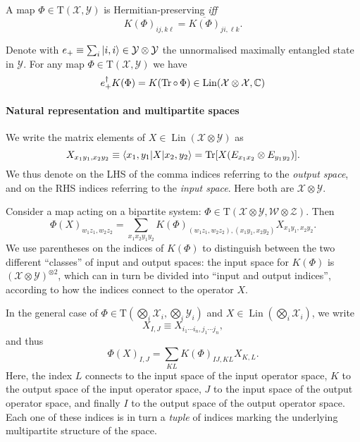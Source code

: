 \documentclass[12pt]{report}
\newcommand{\CC}{\mathbb{C}}
\newcommand{\calY}{{\mathcal{Y}}}
\newcommand{\calW}{{\mathcal{W}}}
\newcommand{\calX}{{\mathcal{X}}}
\newcommand{\calZ}{{\mathcal{Z}}}
\newcommand{\rmT}{{\mathrm{T}}}
\DeclareMathOperator{\Lin}{Lin}
\begin{document}
\begin{prop}
	A map $\Phi\in\rmT(\calX,\calY)$ is Hermitian-preserving \emph{iff}
	\begin{equation}
		K(\Phi)_{ij,k\ell} = \overline{K(\Phi)}_{ji,\ell k}.
	\end{equation}
\end{prop}

\begin{prop}
	Denote with $e_+\equiv \sum_i \ket{i,i}\in\calY\otimes\calY$ the unnormalised maximally entangled state in $\calY$.
	For any map $\Phi\in\rmT(\calX,\calY)$ we have
	\begin{equation}
		e_+^\dagger K(\Phi) = K(\Tr\circ\, \Phi) \in \Lin(\calX\otimes\calX,\CC)
	\end{equation}
\end{prop}

\paragraph{Natural representation and multipartite spaces}
We write the matrix elements of $X\in\Lin(\calX\otimes\calY)$ as
\begin{equation}
	X_{x_1 y_1,x_2 y_2}
	\equiv \langle x_1, y_1 | X | x_2, y_2\rangle
	= \Tr[X (E_{x_1 x_2} \otimes E_{y_1 y_2})].
\end{equation}
We thus denote on the LHS of the comma indices referring to the \emph{output space}, and on the RHS indices referring to the \emph{input space}. Here both are $\calX\otimes\calY$.

Consider a map acting on a bipartite system: $\Phi\in\rmT(\calX\otimes\calY,\calW\otimes\calZ)$. Then
\begin{equation}
	\Phi(X)_{w_1 z_1, w_2 z_2}
	= \sum_{x_1 x_2 y_1 y_2}
	K(\Phi)_{(w_1 z_1, w_2 z_2),(x_1 y_1, x_2 y_2)}
	X_{x_1 y_1,x_2 y_2}.
\end{equation}
We use parentheses on the indices of $K(\Phi)$ to distinguish between the two different ``classes'' of input and output spaces: the input space for $K(\Phi)$ is $(\calX\otimes\calY)^{\otimes 2}$, which can in turn be divided into ``input and output indices'', according to how the indices connect to the operator $X$.

In the general case of $\Phi\in\rmT(\bigotimes_i \calX_i,\bigotimes_i \calY_i)$ and $X\in\Lin(\bigotimes_i \calX_i)$, we write
\begin{equation}
	X_{I,J} \equiv X_{i_1\cdots i_n, j_1\cdots j_n},
\end{equation}
and thus
\begin{equation}
	\Phi(X)_{I,J}
	= \sum_{KL} K(\Phi)_{IJ,KL} X_{K,L}.
\end{equation}
Here, the index $L$ connects to the input space of the input operator space, $K$ to the output space of the input operator space, $J$ to the input space of the output operator space, and finally $I$ to the output space of the output operator space.
Each one of these indices is in turn a \emph{tuple} of indices marking the underlying multipartite structure of the space.
\end{document}
